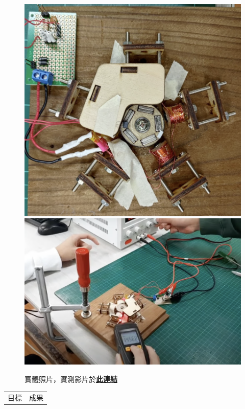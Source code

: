 \documentclass[12pt,a4paper]{article}
\begin{document}
\begin{CJK*}{UTF8}{bkai}
\begin{figure}[h]
        \includegraphics[height=0.2\textheight]{./images/finish3.png}
        \includegraphics[height=0.2\textheight]{./images/demo.png}
        \caption{實體照片，實測影片於\href{https://youtu.be/jbmlMec0Nww}{\textbf{此連結}}}
        \label{fig:demo}
    \end{figure}
    \renewcommand{\arraystretch}{0.8}
    \begin{table}[H]
        \centering
        \begin{tabular}{|c|c|}
            \hline
            目標                            & 成果  \\

\end{tabular}
\end{table}
\end{CJK*}
\end{document}
